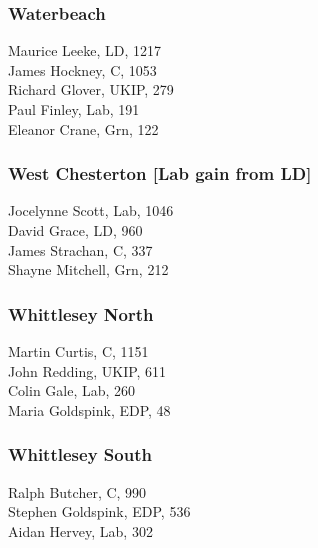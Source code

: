 \documentclass[a4paper,openany,10pt]{book}
\begin{document}
\subsubsection*{Waterbeach}



Maurice Leeke, LD, 1217\\
James Hockney, C, 1053\\
Richard Glover, UKIP, 279\\
Paul Finley, Lab, 191\\
Eleanor Crane, Grn, 122\\


\subsubsection*{West Chesterton \hspace*{\fill}\nolinebreak[1]%
\enspace\hspace*{\fill}
[Lab gain from LD]}



Jocelynne Scott, Lab, 1046\\
David Grace, LD, 960\\
James Strachan, C, 337\\
Shayne Mitchell, Grn, 212\\


\subsubsection*{Whittlesey North}



Martin Curtis, C, 1151\\
John Redding, UKIP, 611\\
Colin Gale, Lab, 260\\
Maria Goldspink, EDP, 48\\


\subsubsection*{Whittlesey South}



Ralph Butcher, C, 990\\
Stephen Goldspink, EDP, 536\\
Aidan Hervey, Lab, 302\\
\end{document}
